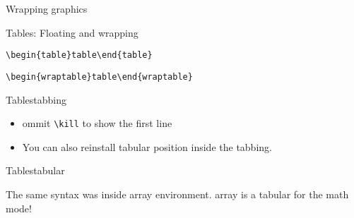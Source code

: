 \begin{frame}[fragile]{Wrapping graphics}\relax
    \cprotect{}

\end{frame}

\begin{frame}[fragile]{Tables: Floating and wrapping}\relax

\verb|\begin{table}table\end{table}|

\verb|\begin{wraptable}table\end{wraptable}|

\end{frame}

\begin{frame}[fragile]{Tables}{tabbing}\relax
    \cprotect{}
     \pause
     \begin{itemize}
         \item ommit \verb|\kill| to show the first line
         \item You can also reinstall tabular position inside the tabbing.
     \end{itemize}
\end{frame}

\begin{frame}[fragile]{Tables}{tabular}\relax
    \cprotect{}

\pause
The same syntax was inside {\csk array} environment. {\csk array} is a {\csk tabular} for the math mode!
\end{frame}

